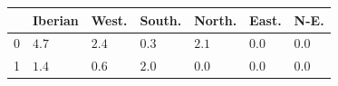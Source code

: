 \begin{tabular}{l}
\toprule
 & Iberian & West. & South. & North. & East. & N-E. \\
 & $\mathbf{4.7}$ & $\mathbf{2.4}$ & ${0.3}$ & ${2.1}$ & ${0.0}$ & ${0.0}$ \\
1 & ${1.4}$ & ${0.6}$ & ${2.0}$ & ${0.0}$ & ${0.0}$ & ${0.0}$ \\
\bottomrule
\end{tabular}
